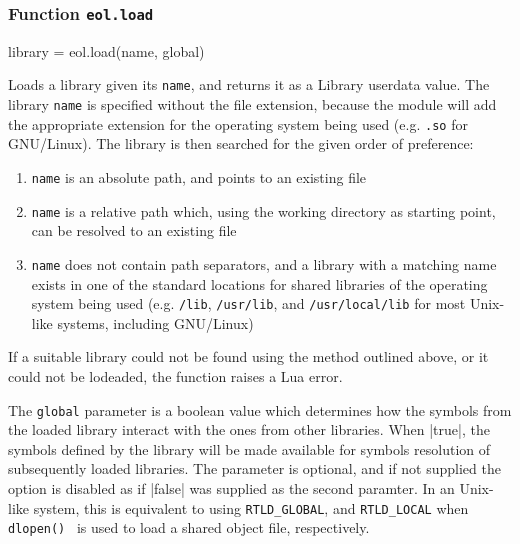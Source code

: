 

\subsubsection{Function \texttt{eol.load}}
	\label{sec:eol-api-load}

\begin{luacode}
  library = eol.load(name, global)
\end{luacode}

Loads a library given its \texttt{name}, and returns it as a \textsf{Library}
userdata value. The library \texttt{name} is specified without the file
extension, because the module will add the appropriate extension for the
operating system being used (e.g. \texttt{.so} for GNU/Linux). The library is
then searched for the given order of preference:

\begin{enumerate}

	\item \texttt{name} is an absolute path, and points to an existing file

	\item \texttt{name} is a relative path which, using the working directory as
	starting point, can be resolved to an existing file

	\item \texttt{name} does not contain path separators, and a library with
	a matching name exists in one of the standard locations for shared libraries
	of the operating system being used (e.g. \texttt{/lib}, \texttt{/usr/lib},
	and \texttt{/usr/local/lib} for most Unix-like systems, including GNU/Linux)

\end{enumerate}

If a suitable library could not be found using the method outlined above, or
it could not be lodeaded, the function raises a Lua error.

The \texttt{global} parameter is a boolean value which determines how the
symbols from the loaded library interact with the ones from other libraries.
When \Mlua|true|, the symbols defined by the library will be made available
for symbols resolution of subsequently loaded libraries. The parameter is
optional, and if not supplied the option is disabled as if \Mlua|false| was
supplied as the second paramter. In an Unix-like system, this is equivalent to
using \texttt{RTLD\_GLOBAL}, and \texttt{RTLD\_LOCAL} when
\texttt{dlopen()}~\cite{opengroup-dlopen} is used to load a shared object file,
respectively.

